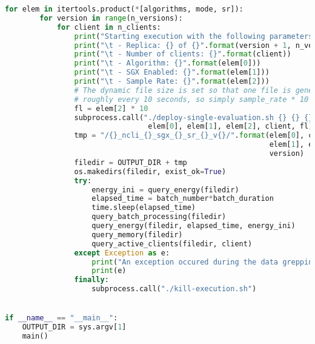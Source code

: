 \begin{lstlisting}[language=Python,caption={Benchmarking and Experiment Deployment Script.},label=code:deployment:experiments]
    for elem in itertools.product(*[algorithms, mode, sr]):
        for version in range(n_versions):
            for client in n_clients:
                print("Starting execution with the following parameters:")
                print("\t - Replica: {} of {}".format(version + 1, n_versions))
                print("\t - Number of clients: {}".format(client))
                print("\t - Algorithm: {}".format(elem[0]))
                print("\t - SGX Enabled: {}".format(elem[1]))
                print("\t - Sample Rate: {}".format(elem[2]))
                # The dynamic file size is set so that one file is generated
                # roughly every 10 seconds, so simply sample_rate * 10 lines.
                fl = elem[2] * 10
                subprocess.call("./deploy-single-evaluation.sh {} {} {} {} {}".format(
                                 elem[0], elem[1], elem[2], client, fl).split(" "))
                tmp = "/{}_ncli_{}_sgx_{}_sr_{}_v{}/".format(elem[0], client,
                                                             elem[1], elem[2],
                                                             version)
                filedir = OUTPUT_DIR + tmp
                os.makedirs(filedir, exist_ok=True)
                try:
                    energy_ini = query_energy(filedir)
                    elapsed_time = batch_number*batch_duration
                    time.sleep(elapsed_time)
                    query_batch_processing(filedir)
                    query_energy(filedir, elapsed_time, energy_ini)
                    query_memory(filedir)
                    query_active_clients(filedir, client)
                except Exception as e:
                    print("An exception occured during the data grepping!")
                    print(e)
                finally:
                    subprocess.call("./kill-execution.sh")


if __name__ == "__main__":
    OUTPUT_DIR = sys.argv[1]
    main()
\end{lstlisting}
